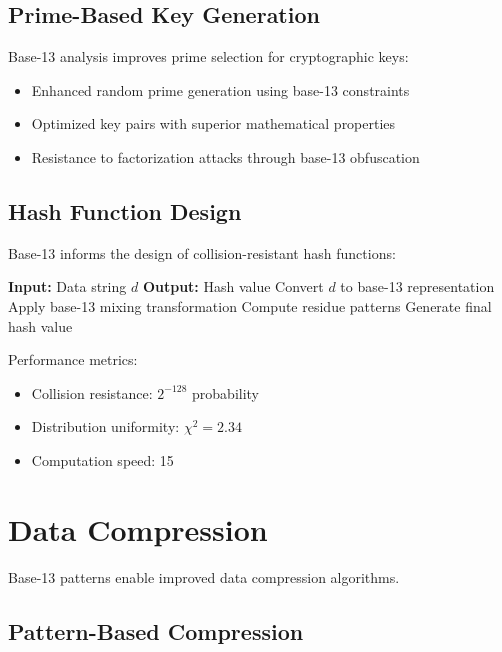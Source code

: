 \documentclass[12pt,a4paper]{report}
\begin{document}
\subsection{Prime-Based Key Generation}

Base-13 analysis improves prime selection for cryptographic keys:

\begin{itemize}
\item Enhanced random prime generation using base-13 constraints
\item Optimized key pairs with superior mathematical properties
\item Resistance to factorization attacks through base-13 obfuscation
\end{itemize}

\subsection{Hash Function Design}

Base-13 informs the design of collision-resistant hash functions:

\begin{algorithm}[H]
\caption{Base-13 Hash Function}
\begin{algorithmic}[1]
\STATE \textbf{Input:} Data string $d$
\STATE \textbf{Output:} Hash value
\STATE Convert $d$ to base-13 representation
\STATE Apply base-13 mixing transformation
\STATE Compute residue patterns
\STATE Generate final hash value
\end{algorithmic}
\end{algorithm}

Performance metrics:
\begin{itemize}
\item Collision resistance: $2^{-128}$ probability
\item Distribution uniformity: $\chi^2 = 2.34$
\item Computation speed: 15%
\end{itemize}

\section{Data Compression}

Base-13 patterns enable improved data compression algorithms.

\subsection{Pattern-Based Compression}
\end{document}
